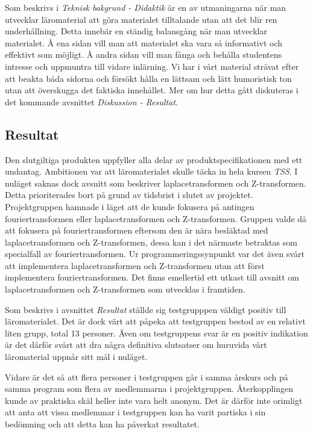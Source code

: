 \documentclass[]{article}
\begin{document}
Som beskrivs i \textit{Teknisk bakgrund - Didaktik} är en av utmaningarna när man utvecklar läromaterial att göra 
materialet tilltalande utan att det blir ren underhållning. Detta innebär en ständig balansgång när man utvecklar 
materialet. Å ena sidan vill man att materialet ska vara så informativt och effektivt som möjligt. Å andra sidan vill 
man fånga och behålla studentens intresse och uppmuntra till vidare inlärning. Vi har i vårt material strävat efter att 
beakta båda sidorna och försökt hålla en lättsam och lätt humoristisk ton utan att överskugga det faktiska innehållet. 
Mer om hur detta gått diskuteras i det kommande avsnittet \textit{Diskussion - Resultat}.

\subsection{Resultat}

Den slutgiltiga produkten uppfyller alla delar av produktspecifikationen med ett undantag. Ambitionen var att 
läromaterialet skulle täcka in hela kursen \textit{TSS}. I nuläget saknas dock avsnitt som beskriver laplacetransformen 
och Z-transformen. Detta prioriterades bort på grund av tidsbrist i slutet av projektet. Projektgruppen hamnade i läget 
att de kunde fokusera på antingen fouriertransformen eller laplacetransformen och Z-transformen. Gruppen valde då att 
fokusera på fouriertransformen eftersom den är nära besläktad med laplacetransformen och Z-transformen, dessa kan i det 
närmaste betraktas som specialfall av fouriertransformen. Ur programmeringssynpunkt var det även svårt att implementera 
laplacetransformen och Z-transformen utan att först implementera fouriertransformen. Det finns emellertid ett utkast 
till avsnitt om laplacetransformen och Z-transformen som utvecklas i framtiden. 

Som beskrivs i avsnittet \textit{Resultat} ställde sig testgrupppen väldigt positiv till läromaterialet.
Det är dock värt att påpeka att testgruppen bestod av en relativt liten grupp, total 13 personer.
Även om testgruppens svar är en positiv indikation är det därför svårt att dra några definitiva slutsatser om huruvida 
vårt läromaterial uppnår sitt mål i nuläget. 

Vidare är det så att flera personer i testgruppen går i samma årskurs och på samma program som flera av medlemmarna i 
projektgruppen. Återkopplingen kunde av praktiska skäl heller inte vara helt anonym. Det är därför inte orimligt att 
anta att vissa medlemmar i testgruppen kan ha varit partiska i sin bedömning och att detta kan ha påverkat resultatet.
\end{document}
